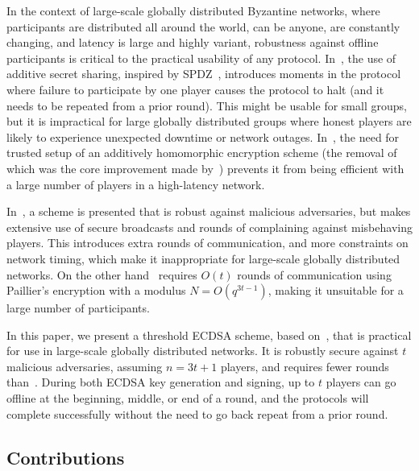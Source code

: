 \documentclass{article}
\theoremstyle{remark}
\begin{document}
In the context of large-scale globally distributed Byzantine networks, where
participants are distributed all around the world, can be anyone, are
constantly changing, and latency is large and highly variant, robustness
against offline participants is critical to the practical usability of any
protocol. In~\cite{gg18}, the use of additive secret sharing, inspired by
SPDZ~\cite{dkl+12}, introduces moments in the protocol where failure to
participate by one player causes the protocol to halt (and it needs to be
repeated from a prior round).  This might be usable for small groups, but it is
impractical for large globally distributed groups where honest players are
likely to experience unexpected downtime or network outages. In~\cite{ggn16},
the need for trusted setup of an additively homomorphic encryption scheme (the
removal of which was the core improvement made by~\cite{gg18}) prevents it from
being efficient with a large number of players in a high-latency network.

In~\cite{gjkr96}, a scheme is presented that is robust against malicious
adversaries, but makes extensive use of secure broadcasts and rounds of
complaining against misbehaving players. This introduces extra rounds of
communication, and more constraints on network timing, which make it
inappropriate for large-scale globally distributed networks.  On the other
hand~\cite{mr04} requires $O(t)$ rounds of communication using Paillier’s
encryption with a modulus $N = O(q^{3t-1})$, making it unsuitable for a large
number of participants.

In this paper, we present a threshold ECDSA scheme, based on~\cite{gjkr96},
that is practical for use in large-scale globally distributed networks. It is
robustly secure against $t$ malicious adversaries, assuming $n = 3t + 1$
players, and requires fewer rounds than~\cite{gjkr96}. During both ECDSA key
generation and signing, up to $t$ players can go offline at the beginning,
middle, or end of a round, and the protocols will complete successfully without
the need to go back repeat from a prior round.

\subsection{Contributions}
\end{document}
